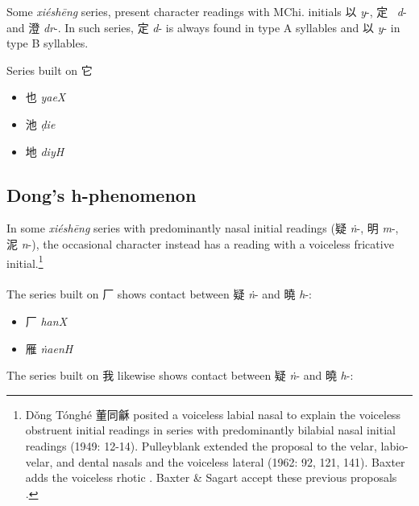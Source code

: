  Some \emph{xiéshēng}
series, 
present character
readings with MChi.  initials 以  \emph{y}-, 定~ \emph{d}- and 澄
 \emph{dr}-. In such series, 定  \emph{d}- is always found in type A
syllables and 以 \emph{y}- in type B syllables. 

Series built on {\Large{它}} %
\begin{itemize}\item
{\Large{也}}  \emph{yaeX} 

\item
{\Large{池}}  \emph{ ḍie} 

\item
{\Large{地}}  \emph{diyH} 
\end{itemize}

\subsection{Dong's h-phenomenon}
In some
 \emph{xiéshēng} series with predominantly nasal initial
readings (疑 \textit{ṅ}-, 明 \textit{m}-,  泥 \textit{n}-), the occasional character instead has a reading with a
voiceless fricative initial.\footnote{Dǒng Tónghé 董同龢 posited a voiceless
labial nasal to explain the voiceless obstruent initial readings in
series with predominantly bilabial nasal initial readings (1949: 12-14).
Pulleyblank extended the proposal to the velar, labio-velar, and dental
nasals and the voiceless lateral (1962: 92, 121, 141).
Baxter adds the
voiceless rhotic 
\citep[201-202]{Baxter1992}. 
Baxter \& Sagart accept these previous
proposals 
\citeyearpar[111-116]{Baxter2014OldChinese}.}
\paragraph{} The series built on ⼚ 
shows contact between  疑 \textit{ṅ}- and 曉
 \emph{h}-:


\begin{itemize}\item
{\Large{⼚}}  \emph{hanX} %
\item
{\Large{雁}}  \emph{ṅaenH} %
\end{itemize}

The series built on 我 
likewise shows contact between 疑 \textit{ṅ}- and 曉
 \emph{h}-:

